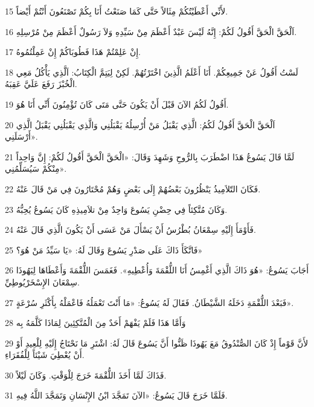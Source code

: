\par 15 لأَنِّي أَعْطَيْتُكُمْ مِثَالاً حَتَّى كَمَا صَنَعْتُ أَنَا بِكُمْ تَصْنَعُونَ أَنْتُمْ أَيْضاً.
\par 16 اَلْحَقَّ الْحَقَّ أَقُولُ لَكُمْ: إِنَّهُ لَيْسَ عَبْدٌ أَعْظَمَ مِنْ سَيِّدِهِ وَلاَ رَسُولٌ أَعْظَمَ مِنْ مُرْسِلِهِ.
\par 17 إِنْ عَلِمْتُمْ هَذَا فَطُوبَاكُمْ إِنْ عَمِلْتُمُوهُ.
\par 18 لَسْتُ أَقُولُ عَنْ جَمِيعِكُمْ. أَنَا أَعْلَمُ الَّذِينَ اخْتَرْتُهُمْ. لَكِنْ لِيَتِمَّ الْكِتَابُ: اَلَّذِي يَأْكُلُ مَعِي الْخُبْزَ رَفَعَ عَلَيَّ عَقِبَهُ.
\par 19 أَقُولُ لَكُمُ الآنَ قَبْلَ أَنْ يَكُونَ حَتَّى مَتَى كَانَ تُؤْمِنُونَ أَنِّي أَنَا هُوَ.
\par 20 اَلْحَقَّ الْحَقَّ أَقُولُ لَكُمُ: الَّذِي يَقْبَلُ مَنْ أُرْسِلُهُ يَقْبَلُنِي وَالَّذِي يَقْبَلُنِي يَقْبَلُ الَّذِي أَرْسَلَنِي».
\par 21 لَمَّا قَالَ يَسُوعُ هَذَا اضْطَرَبَ بِالرُّوحِ وَشَهِدَ وَقَالَ: «الْحَقَّ الْحَقَّ أَقُولُ لَكُمْ: إِنَّ وَاحِداً مِنْكُمْ سَيُسَلِّمُنِي».
\par 22 فَكَانَ التّلاَمِيذُ يَنْظُرُونَ بَعْضُهُمْ إِلَى بَعْضٍ وَهُمْ مُحْتَارُونَ فِي مَنْ قَالَ عَنْهُ.
\par 23 وَكَانَ مُتَّكِئاً فِي حِضْنِ يَسُوعَ وَاحِدٌ مِنْ تلاَمِيذِهِ كَانَ يَسُوعُ يُحِبُّهُ.
\par 24 فَأَوْمَأَ إِلَيْهِ سِمْعَانُ بُطْرُسُ أَنْ يَسْأَلَ مَنْ عَسَى أَنْ يَكُونَ الَّذِي قَالَ عَنْهُ.
\par 25 فَاتَّكَأَ ذَاكَ عَلَى صَدْرِ يَسُوعَ وَقَالَ لَهُ: «يَا سَيِّدُ مَنْ هُوَ؟»
\par 26 أَجَابَ يَسُوعُ: «هُوَ ذَاكَ الَّذِي أَغْمِسُ أَنَا اللُّقْمَةَ وَأُعْطِيهِ». فَغَمَسَ اللُّقْمَةَ وَأَعْطَاهَا لِيَهُوذَا سِمْعَانَ الإِسْخَرْيُوطِيِّ.
\par 27 فَبَعْدَ اللُّقْمَةِ دَخَلَهُ الشَّيْطَانُ. فَقَالَ لَهُ يَسُوعُ: «مَا أَنْتَ تَعْمَلُهُ فَاعْمَلْهُ بِأَكْثَرِ سُرْعَةٍ».
\par 28 وَأَمَّا هَذَا فَلَمْ يَفْهَمْ أَحَدٌ مِنَ الْمُتَّكِئِينَ لِمَاذَا كَلَّمَهُ بِه
\par 29 لأَنَّ قَوْماً إِذْ كَانَ الصُّنْدُوقُ مَعَ يَهُوذَا ظَنُّوا أَنَّ يَسُوعَ قَالَ لَهُ: اشْتَرِ مَا نَحْتَاجُ إِلَيْهِ لِلْعِيدِ أَوْ أَنْ يُعْطِيَ شَيْئاً لِلْفُقَرَاءِ.
\par 30 فَذَاكَ لَمَّا أَخَذَ اللُّقْمَةَ خَرَجَ لِلْوَقْتِ. وَكَانَ لَيْلاً.
\par 31 فَلَمَّا خَرَجَ قَالَ يَسُوعُ: «الآنَ تَمَجَّدَ ابْنُ الإِنْسَانِ وَتَمَجَّدَ اللَّهُ فِيهِ.
